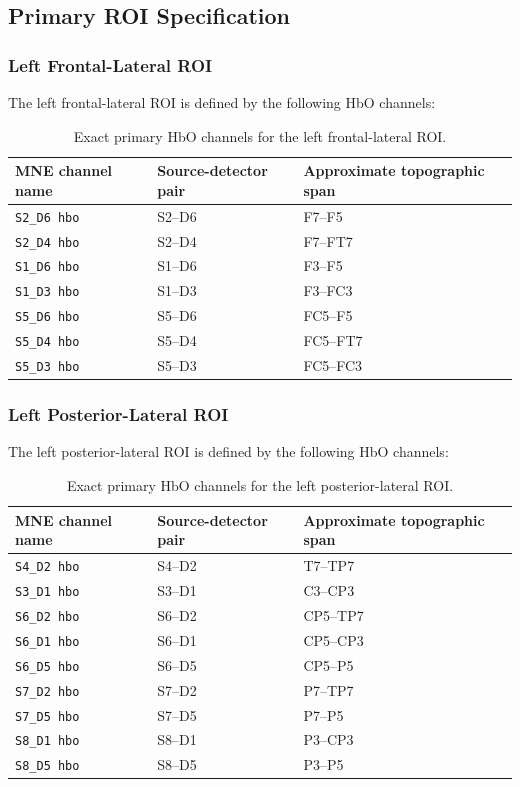 \subsection{Primary ROI Specification}

\subsubsection{Left Frontal-Lateral ROI}
The left frontal-lateral ROI is defined by the following HbO channels:

\begin{table}[ht]
\centering
\caption{Exact primary HbO channels for the left frontal-lateral ROI.}
\label{tab:front_roi_hbo}
\begin{tabular}{lll}
\hline
MNE channel name & Source-detector pair & Approximate topographic span \\
\hline
\texttt{S2\_D6 hbo} & S2--D6 & F7--F5 \\
\texttt{S2\_D4 hbo} & S2--D4 & F7--FT7 \\
\texttt{S1\_D6 hbo} & S1--D6 & F3--F5 \\
\texttt{S1\_D3 hbo} & S1--D3 & F3--FC3 \\
\texttt{S5\_D6 hbo} & S5--D6 & FC5--F5 \\
\texttt{S5\_D4 hbo} & S5--D4 & FC5--FT7 \\
\texttt{S5\_D3 hbo} & S5--D3 & FC5--FC3 \\
\hline
\end{tabular}
\end{table}

\subsubsection{Left Posterior-Lateral ROI}
The left posterior-lateral ROI is defined by the following HbO channels:

\begin{table}[ht]
\centering
\caption{Exact primary HbO channels for the left posterior-lateral ROI.}
\label{tab:back_roi_hbo}
\begin{tabular}{lll}
\hline
MNE channel name & Source-detector pair & Approximate topographic span \\
\hline
\texttt{S4\_D2 hbo} & S4--D2 & T7--TP7 \\
\texttt{S3\_D1 hbo} & S3--D1 & C3--CP3 \\
\texttt{S6\_D2 hbo} & S6--D2 & CP5--TP7 \\
\texttt{S6\_D1 hbo} & S6--D1 & CP5--CP3 \\
\texttt{S6\_D5 hbo} & S6--D5 & CP5--P5 \\
\texttt{S7\_D2 hbo} & S7--D2 & P7--TP7 \\
\texttt{S7\_D5 hbo} & S7--D5 & P7--P5 \\
\texttt{S8\_D1 hbo} & S8--D1 & P3--CP3 \\
\texttt{S8\_D5 hbo} & S8--D5 & P3--P5 \\
\hline
\end{tabular}
\end{table}

